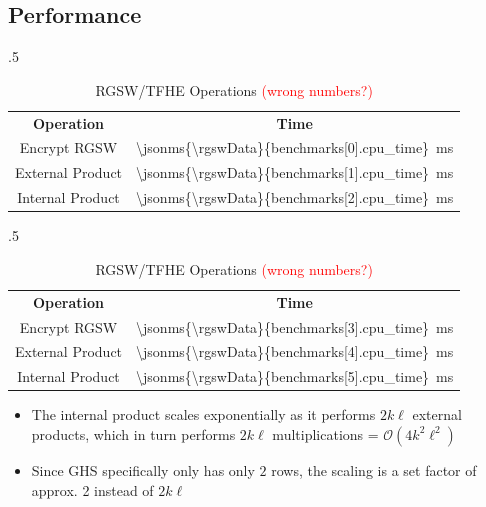 \subsection{Performance}
\begin{table}[H]
    \begin{subtable}{.5\linewidth}
        \begin{tabular}{cc}
        \textbf{Operation} & \textbf{Time} \\
            Encrypt RGSW        & \num{\jsonms{\rgswData}{benchmarks[0].cpu_time}}~ms \\
            External Product    & \num{\jsonms{\rgswData}{benchmarks[1].cpu_time}}~ms \\
            Internal Product    & \num{\jsonms{\rgswData}{benchmarks[2].cpu_time}}~ms
        \end{tabular}
        \caption{BV}
        \label{tab:bench:operations:bv}
    \end{subtable}%
    \begin{subtable}{.5\linewidth}
      \centering
        \begin{tabular}{cc}
        \textbf{Operation} & \textbf{Time} \\
            Encrypt RGSW        & \num{\jsonms{\rgswData}{benchmarks[3].cpu_time}}~ms \\
            External Product    & \num{\jsonms{\rgswData}{benchmarks[4].cpu_time}}~ms \\
            Internal Product    & \num{\jsonms{\rgswData}{benchmarks[5].cpu_time}}~ms\footnotemark
        \end{tabular}
        \caption{GHS/Hybrid}
        \label{tab:bench:operations:ghs}
    \end{subtable}
    \caption{RGSW/TFHE Operations \textcolor{red}{(wrong numbers?)}}
\end{table}

\begin{itemize}
    \item The internal product scales exponentially as it performs $2k\ell$ external products, which in turn performs $2k\ell$ multiplications = $\mathcal{O}(4k^2\ell^2)$
    \item Since GHS specifically only has only $2$ rows, the scaling is a set factor of approx. 2 instead of $2k\ell$
\end{itemize}
